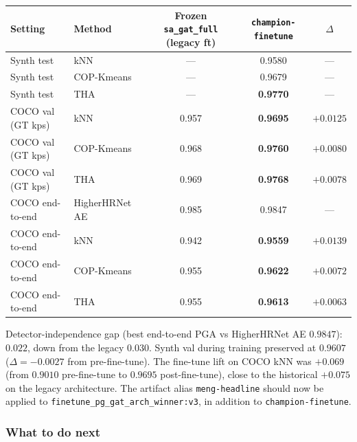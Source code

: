 \begin{tabular}{llccc}
\hline
\textbf{Setting} & \textbf{Method} & \textbf{Frozen \texttt{sa\_gat\_full} (legacy ft)} & \textbf{\texttt{champion-finetune}} & \textbf{$\Delta$} \\
\hline
Synth test           & kNN         & ---    & 0.9580          & ---       \\
Synth test           & COP-Kmeans  & ---    & 0.9679          & ---       \\
Synth test           & THA         & ---    & \textbf{0.9770} & ---       \\
\hline
COCO val (GT kps)    & kNN         & 0.957  & \textbf{0.9695} & $+0.0125$ \\
COCO val (GT kps)    & COP-Kmeans  & 0.968  & \textbf{0.9760} & $+0.0080$ \\
COCO val (GT kps)    & THA         & 0.969  & \textbf{0.9768} & $+0.0078$ \\
\hline
COCO end-to-end      & HigherHRNet AE & 0.985 & 0.9847       & ---       \\
COCO end-to-end      & kNN         & 0.942  & \textbf{0.9559} & $+0.0139$ \\
COCO end-to-end      & COP-Kmeans  & 0.955  & \textbf{0.9622} & $+0.0072$ \\
COCO end-to-end      & THA         & 0.955  & \textbf{0.9613} & $+0.0063$ \\
\hline
\end{tabular}

\vspace{0.5em}

Detector-independence gap (best end-to-end PGA vs HigherHRNet AE $0.9847$): $\mathbf{0.022}$, down from the legacy $0.030$.
Synth val during training preserved at $0.9607$ ($\Delta = -0.0027$ from pre-fine-tune).
The fine-tune lift on COCO kNN was $+0.069$ (from $0.9010$ pre-fine-tune to $0.9695$ post-fine-tune), close to the historical $+0.075$ on the legacy architecture.
The artifact alias \texttt{meng-headline} should now be applied to \texttt{finetune\_pg\_gat\_arch\_winner:v3}, in addition to \texttt{champion-finetune}.

\subsubsection{What to do next}

